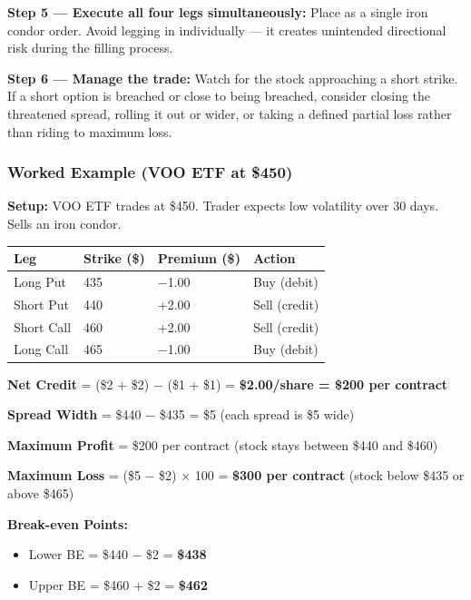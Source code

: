 \documentclass[12pt,openany]{book}
\begin{document}
\textbf{Step 5 — Execute all four legs simultaneously:} Place as a single iron condor order. Avoid legging in individually — it creates unintended directional risk during the filling process.

\textbf{Step 6 — Manage the trade:} Watch for the stock approaching a short strike. If a short option is breached or close to being breached, consider closing the threatened spread, rolling it out or wider, or taking a defined partial loss rather than riding to maximum loss.



\subsubsection{Worked Example (VOO ETF at \$450)}

\textbf{Setup:} VOO ETF trades at \$450. Trader expects low volatility over 30 days. Sells an iron condor.

\begin{center}
\scriptsize
\setlength{\tabcolsep}{3pt}
\begin{tabular}{|L{3.31cm}|L{3.31cm}|L{3.31cm}|L{3.31cm}|}
\hline
Leg & Strike (\$) & Premium (\$) & Action \\
\hline
Long Put & 435 & −1.00 & Buy (debit) \\
\hline
Short Put & 440 & +2.00 & Sell (credit) \\
\hline
Short Call & 460 & +2.00 & Sell (credit) \\
\hline
Long Call & 465 & −1.00 & Buy (debit) \\
\hline
\end{tabular}
\end{center}

\textbf{Net Credit} = (\$2 + \$2) − (\$1 + \$1) = \textbf{\$2.00/share = \$200 per contract}

\textbf{Spread Width} = \$440 − \$435 = \$5 (each spread is \$5 wide)

\textbf{Maximum Profit} = \$200 per contract (stock stays between \$440 and \$460)

\textbf{Maximum Loss} = (\$5 − \$2) × 100 = \textbf{\$300 per contract} (stock below \$435 or above \$465)

\textbf{Break-even Points:}
\begin{itemize}[leftmargin=*]
    \item Lower BE = \$440 − \$2 = \textbf{\$438}
    \item Upper BE = \$460 + \$2 = \textbf{\$462}
\end{itemize}
\end{document}
